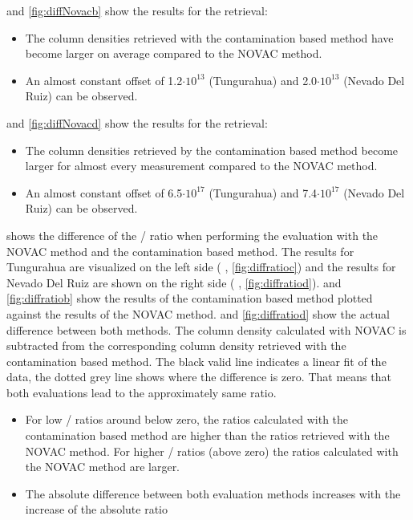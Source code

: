 \documentclass  [
  paper    = a4,
  BCOR     = 10mm,
  twoside,
  fontsize = 12pt,
  fleqn,
  toc      = bibnumbered,
  toc      = listofnumbered,
  numbers  = noendperiod,
  headings = normal,
  listof   = leveldown,
  version  = 3.03
]                                       {scrreprt}
\begin{document}
	 and \ref{fig:diffNovacb} show the results for the   retrieval:
	\begin{itemize}
		\item The   column densities retrieved with the contamination based method have become larger on average compared to the NOVAC method.
		\item An almost constant offset of 1.2$\cdot 10 ^{13}$ (Tungurahua) and 2.0$\cdot 10 ^{13}$ (Nevado Del Ruiz) can be observed.
	\end{itemize}
	  and \ref{fig:diffNovacd} show the results for the   retrieval:
	\begin{itemize}
		\item The   column densities retrieved by the contamination based method become larger for almost every measurement compared to the NOVAC method.
		\item An almost constant offset of 6.5$\cdot 10 ^{17}$ (Tungurahua) and 7.4$\cdot 10 ^{17}$ (Nevado Del Ruiz) can be observed.
	\end{itemize}
 shows the difference of the / ratio when performing the evaluation with the NOVAC method and the contamination based method. The results for Tungurahua are visualized on the left side ( , \ref{fig:diffratioc}) and the results for Nevado Del Ruiz are shown on the right side  ( , \ref{fig:diffratiod}).  and \ref{fig:diffratiob} show the results of the contamination based method plotted against the results of the NOVAC method.   and \ref{fig:diffratiod} show the actual difference between both methods. The column density calculated with NOVAC is subtracted from the corresponding column density retrieved with the contamination based method. The black valid line indicates a linear fit of the data, the dotted grey line shows where the difference is zero. That means that both evaluations lead to the approximately same ratio.\\
\begin{itemize}
	\item For low /  ratios around below zero, the ratios calculated with the contamination based method are higher than the ratios retrieved with the NOVAC method. For higher /  ratios (above zero) the ratios calculated with the NOVAC method are larger.
	\item The absolute difference between both evaluation methods increases with the increase of the absolute ratio
\end{itemize}
\end{document}
